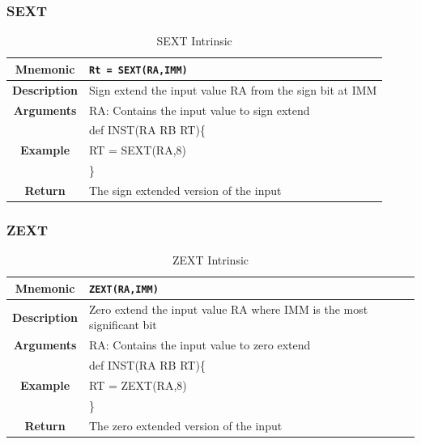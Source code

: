 \documentclass{article}
\begin{document}
\clearpage
\subsubsection{SEXT}
\label{sec:SEXT}

\begin{table}[h]
\begin{center}
\caption{SEXT Intrinsic}
\vspace{0.125in}
\label{tab:SEXTIntrinsic}
\begin{tabular}{|c|l|}
\hline
\textbf{Mnemonic} & \texttt{Rt = SEXT(RA,IMM)}\\
\hline
\textbf{Description} & Sign extend the input value RA from the sign bit at IMM\\
\hline
\textbf{Arguments} & RA: Contains the input value to sign extend\\
\hline
\multirow{3}{*}{\textbf{Example}} & def INST(RA RB RT)\{\\
                          			  &   RT = SEXT(RA,8)\\
                                                    & \}\\
\hline
\textbf{Return} & The sign extended version of the input\\                                                    
\hline
\end{tabular}
\end{center}
\end{table}

\clearpage
\subsubsection{ZEXT}
\label{sec:ZEXT}

\begin{table}[h]
\begin{center}
\caption{ZEXT Intrinsic}
\vspace{0.125in}
\label{tab:ZEXTIntrinsic}
\begin{tabular}{|c|l|}
\hline
\textbf{Mnemonic} & \texttt{ZEXT(RA,IMM)}\\
\hline
\textbf{Description} & Zero extend the input value RA where IMM is the most significant bit\\
\hline
\textbf{Arguments} & RA: Contains the input value to zero extend\\
\hline
\multirow{3}{*}{\textbf{Example}} & def INST(RA RB RT)\{\\
                          			  &   RT = ZEXT(RA,8)\\
                                                    & \}\\
\hline
\textbf{Return} & The zero extended version of the input\\                                                    
\hline
\end{tabular}
\end{center}
\end{table}
\end{document}

